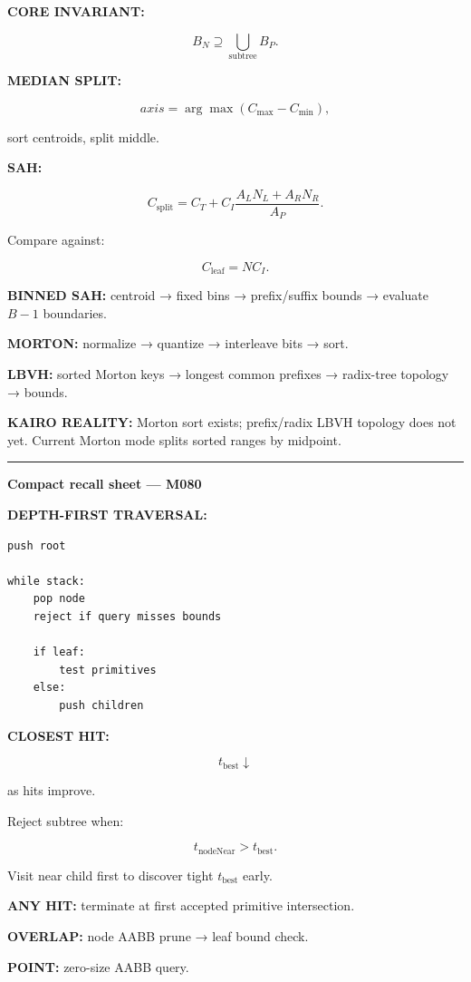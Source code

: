 \textbf{CORE INVARIANT:}

\[
B_N\supseteq
\bigcup_{\text{subtree}}B_P.
\]

\textbf{MEDIAN SPLIT:}

\[
axis=\arg\max
(C_{\max}-C_{\min}),
\]

sort centroids, split middle.

\textbf{SAH:}

\[
C_{\text{split}}
=
C_T+
C_I
\frac{
A_LN_L+A_RN_R
}{
A_P
}.
\]

Compare against:

\[
C_{\text{leaf}}
=
NC_I.
\]

\textbf{BINNED SAH:} centroid → fixed bins → prefix/suffix bounds → evaluate \(B-1\) boundaries.

\textbf{MORTON:} normalize → quantize → interleave bits → sort.

\textbf{LBVH:} sorted Morton keys → longest common prefixes → radix-tree topology → bounds.

\textbf{KAIRO REALITY:} Morton sort exists; prefix/radix LBVH topology does not yet. Current Morton mode splits sorted ranges by midpoint.

\begin{center}\rule{0.5\linewidth}{0.5pt}\end{center}

\textbf{Compact recall sheet --- M080}

\textbf{DEPTH-FIRST TRAVERSAL:}

\begin{verbatim}
push root

while stack:
    pop node
    reject if query misses bounds

    if leaf:
        test primitives
    else:
        push children
\end{verbatim}

\textbf{CLOSEST HIT:}

\[
t_{\text{best}}
\downarrow
\]

as hits improve.

Reject subtree when:

\[
t_{\text{nodeNear}}>t_{\text{best}}.
\]

Visit near child first to discover tight \(t_{\text{best}}\) early.

\textbf{ANY HIT:} terminate at first accepted primitive intersection.

\textbf{OVERLAP:} node AABB prune → leaf bound check.

\textbf{POINT:} zero-size AABB query.

